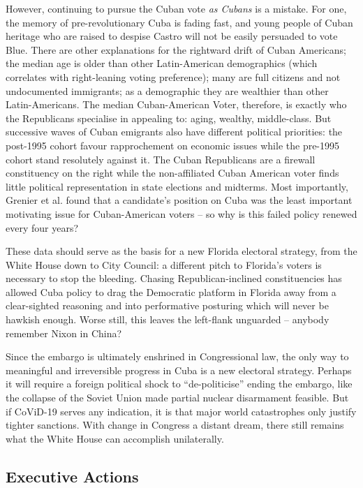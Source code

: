 \documentclass[letterpaper,12pt,twoside]{article} %
\begin{document}
\begin{multicols}{2}
However, continuing to pursue the Cuban vote \textit{as Cubans} is a mistake. For one, the memory of pre-revolutionary Cuba is fading fast, and young people of Cuban heritage who are raised to despise Castro will not be easily persuaded to vote Blue. There are other explanations for the rightward drift of Cuban Americans; the median age is older than other Latin-American demographics (which correlates with right-leaning voting preference); many are full citizens and not undocumented immigrants; as a demographic they are wealthier than other Latin-Americans.\autocite{noe-bustamante2019pew} The median Cuban-American Voter, therefore, is exactly who the Republicans specialise in appealing to: aging, wealthy, middle-class. But successive waves of Cuban emigrants also have different political priorities: the post-1995 cohort favour rapprochement on economic issues while the pre-1995 cohort stand resolutely against it.\autocite{grenier20182018} The Cuban Republicans are a firewall constituency on the right while the non-affiliated Cuban American voter finds little political representation in state elections and midterms. Most importantly, Grenier et al. found that a candidate's position on Cuba was the least important motivating issue for Cuban-American voters -- so why is this failed policy renewed every four years?

These data should serve as the basis for a new Florida electoral strategy, from the White House down to City Council: a different pitch to Florida's voters is necessary to stop the bleeding. Chasing Republican-inclined constituencies has allowed Cuba policy to drag the Democratic platform in Florida away from a clear-sighted reasoning and into performative posturing which will never be hawkish enough. Worse still, this leaves the left-flank unguarded -- anybody remember Nixon in China?

Since the embargo is ultimately enshrined in Congressional law, the only way to meaningful and irreversible progress in Cuba is a new electoral strategy. Perhaps it will require a foreign political shock to ``de-politicise'' ending the embargo, like the collapse of the Soviet Union made partial nuclear disarmament feasible. But if CoViD-19 serves any indication, it is that major world catastrophes only justify tighter sanctions. With change in Congress a distant dream, there still remains what the White House can accomplish unilaterally.

\subsection*{Executive Actions}


\end{multicols}
\end{document}
